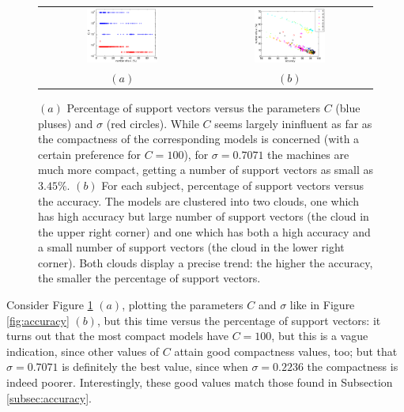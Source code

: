 \documentclass[a4paper,10pt,conference]{ieeeconf}
\begin{document}
\begin{figure}[!t]
  \begin{center}
    \begin{tabular}{cc}
      \includegraphics[width=0.45\textwidth]{svs_params.eps} &
      \includegraphics[width=0.45\textwidth]{acc_svs.eps} \\
      $(a)$ & $(b)$
    \end{tabular}
    \caption{$(a)$ Percentage of support vectors versus the parameters
    $C$ (blue pluses) and $\sigma$ (red circles). While $C$ seems
    largely ininfluent as far as the compactness of the corresponding
    models is concerned (with a certain preference for $C=100$), for
    $\sigma=0.7071$ the machines are much more compact, getting a
    number of support vectors as small as $3.45\%$. $(b)$ For each
    subject, percentage of support vectors versus the accuracy. The
    models are clustered into two clouds, one which has high accuracy
    but large number of support vectors (the cloud in the upper right
    corner) and one which has both a high accuracy and a small number
    of support vectors (the cloud in the lower right corner). Both
    clouds display a precise trend: the higher the accuracy, the
    smaller the percentage of support vectors.}
    \label{fig:svs_params}
  \end{center}
\end{figure}

Consider Figure \ref{fig:svs_params} $(a)$, plotting the parameters
$C$ and $\sigma$ like in Figure \ref{fig:accuracy} $(b)$, but this
time versus the percentage of support vectors: it turns out that the
most compact models have $C=100$, but this is a vague indication,
since other values of $C$ attain good compactness values, too; but
that $\sigma=0.7071$ is definitely the best value, since when
$\sigma=0.2236$ the compactness is indeed poorer. Interestingly, these
good values match those found in Subsection \ref{subsec:accuracy}.
\end{document}
